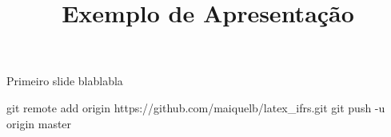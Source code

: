 \documentclass{beamer}
\title{Exemplo de Apresentação}
\begin{document}
\frame{\titlepage}

\begin{frame}{Primeiro slide}
blablabla
 
\end{frame}

git remote add origin https://github.com/maiquelb/latex_ifrs.git
git push -u origin master
\end{document}
